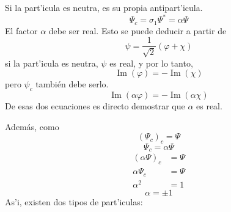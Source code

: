 Si la part'icula es neutra, es su propia antipart'icula.
\begin{equation}
\Psi_{c}=\sigma_{1}\Psi^{\ast}=\alpha\Psi
\end{equation}
El factor $\alpha$ debe ser real. Esto se puede deducir a partir de
\begin{equation}
\psi=\frac{1}{\sqrt{2}}\left(  \varphi+\chi\right)
\end{equation}
si la part'icula es neutra, $\psi$ es real, y por lo tanto,
\begin{equation}
\operatorname{Im}\left(  \varphi\right)  =-\operatorname{Im}\left(
\chi\right)
\end{equation}
pero $\psi_{c}$ tambi\'{e}n debe serlo.
\begin{equation}
\operatorname{Im}\left(  \alpha\varphi\right)  =-\operatorname{Im}\left(
\alpha\chi\right)
\end{equation}
De esas dos ecuaciones es directo demostrar que $\alpha$ es real.

Adem\'{a}s, como
\begin{equation}
\left(  \Psi_{c}\right)  _{c}=\Psi
\end{equation}
\begin{equation}
\Psi_{c}=\alpha\Psi
\end{equation}
\begin{align*}
\left(  \alpha\Psi\right)  _{c}  & =\Psi\\
\alpha\Psi_{c}  & =\Psi\\
\alpha^{2}  & =1
\end{align*}
\begin{equation}
\alpha=\pm1
\end{equation}
As'i, existen dos tipos de part'iculas:

